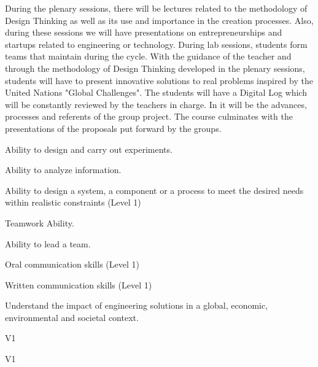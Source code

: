 \begin{syllabus}


\begin{justification}
During the plenary sessions, there will be lectures related to the methodology of Design Thinking as well as its use and importance in the creation processes. Also, during these sessions we will have presentations on entrepreneurships and startups related to engineering or technology.
During lab sessions, students form teams that maintain during the cycle. With the guidance of the teacher and through the methodology of Design Thinking developed in the plenary sessions, students will have to present innovative solutions to real problems inspired by the United Nations "Global Challenges".
The students will have a Digital Log which will be constantly reviewed by the teachers in charge. In it will be the advances, processes and referents of the group project. The course culminates with the presentations of the proposals put forward by the groups.
\end{justification}

\begin{goals}
\item Ability to design and carry out experiments.
\item Ability to analyze information.
\item Ability to design a system, a component or a process to meet the desired needs within realistic constraints (Level 1)
\item Teamwork Ability.
\item Ability to lead a team.
\item Oral communication skills (Level 1)
\item Written communication skills (Level 1)
\item Understand the impact of engineering solutions in a global, economic, environmental and societal context.
\end{goals}
    
\begin{outcomes}{V1}
    \item {}
    \item {}
\end{outcomes}

\begin{competences}{V1}
    \item {}
\end{competences}


\end{syllabus}

